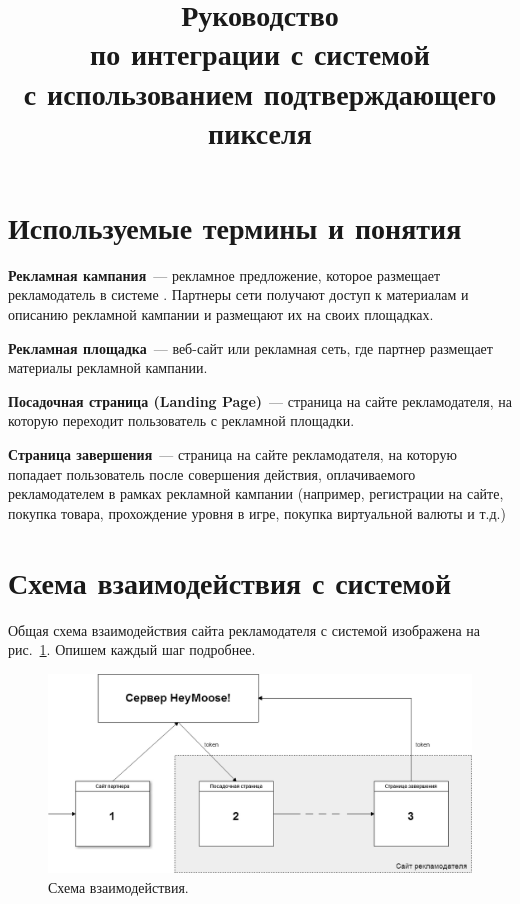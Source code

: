 \documentclass[a4paper,12pt]{article}
\title{Руководство \\ по интеграции с системой \heymoose \\ с использованием подтверждающего пикселя}
\begin{document}
\maketitle

\thispagestyle{empty}

\newpage

\tableofcontents

\newpage

\section{Используемые термины и понятия}

\textbf{Рекламная кампания}~--- рекламное предложение, которое размещает рекламодатель в системе \heymoose. Партнеры сети \heymoose{} получают доступ к материалам и описанию рекламной кампании и размещают их на своих площадках.

\textbf{Рекламная площадка}~--- веб-сайт или рекламная сеть, где партнер размещает материалы рекламной кампании.

\textbf{Посадочная страница (Landing Page)}~--- страница на сайте рекламодателя, на которую переходит пользователь с рекламной площадки.

\textbf{Страница завершения}~--- страница на сайте рекламодателя, на которую попадает пользователь после совершения действия, оплачиваемого рекламодателем в рамках рекламной кампании (например, регистрации на сайте, покупка товара, прохождение уровня в игре, покупка виртуальной валюты и т.д.)

\newpage

\section{Схема взаимодействия с системой \heymoose}

Общая схема взаимодействия сайта рекламодателя с системой \heymoose{} изображена на рис.~\ref{fig:scheme}. Опишем каждый шаг подробнее.

\begin{figure}[!ht]
\centering
\includegraphics[width=\textwidth]{include/scheme.png}
\caption{Схема взаимодействия.}
\label{fig:scheme}
\end{figure}
\end{document}
